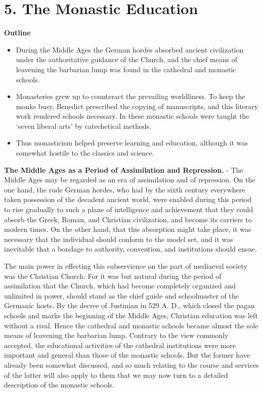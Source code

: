 \documentclass[
]{book}
\providecommand{\tightlist}{%
  \setlength{\itemsep}{0pt}\setlength{\parskip}{0pt}}
\begin{document}
\hypertarget{the-monastic-education}{%
\chapter{5. The Monastic Education}\label{the-monastic-education}}

\textbf{Outline}

\begin{itemize}
\tightlist
\item
  During the Middle Ages the German hordes absorbed ancient civilization under the authoritative guidance of the Church, and the chief means of leavening the barbarian lump was found in the cathedral and monastic schools.
\item
  Monasteries grew up to counteract the prevailing worldliness. To keep the monks busy, Benedict prescribed the copying of manuscripts, and this literary work rendered schools necessary. In these monastic schools were taught the `seven liberal arts' by catechetical methods.
\item
  Thus monasticism helped preserve learning and education, although it was somewhat hostile to the classics and science.
\end{itemize}

\textbf{The Middle Ages as a Period of Assimilation and Repression.} - The Middle Ages may be regarded as an era of assimilation and of repression. On the one hand, the rude German hordes, who had by the sixth century everywhere taken possession of the decadent ancient world, were enabled during this period to rise gradually to such a plane of intelligence and achievement that they could absorb the Greek, Roman, and Christian civilization, and become its carriers to modern times. On the other hand, that this absorption might take place, it was necessary that the individual should conform to the model set, and it was inevitable that a bondage to authority, convention, and institutions should ensue.

The main power in effecting this subservience on the part of mediaeval society was the Christian Church. For it was but natural during the period of assimilation that the Church, which had become completely organized and unlimited in power, should stand as the chief guide and schoolmaster of the Germanic hosts. By the decree of Justinian in 529 A. D., which closed the pagan schools and marks the beginning of the Middle Ages, Christian education was left without a rival. Hence the cathedral and monastic schools became almost the sole means of leavening the barbarian lump. Contrary to the view commonly accepted, the educational activities of the cathedral institutions were more important and general than those of the monastic schools. But the former have already been somewhat discussed, and so much relating to the course and services of the latter will also apply to them that we may now turn to a detailed description of the monastic schools.
\end{document}
